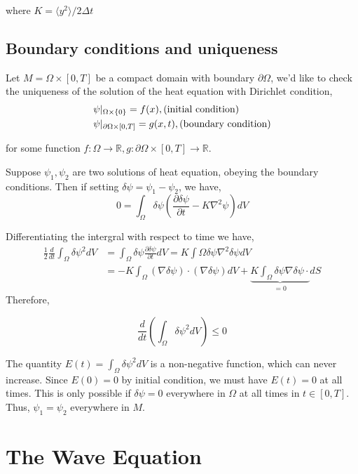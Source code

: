 \documentclass{article}
\theoremstyle{definition}
\begin{document}
where $K=\langle y^2 \rangle /2\Delta t$
\subsection{Boundary conditions and uniqueness}
Let $M=\Omega \times [0,T]$ be a compact domain with boundary $\partial \Omega$, we'd like to check the uniqueness of the solution of the heat equation with Dirichlet condition,
\begin{align}
&\psi |_{\Omega \times \{0\}}=f(x), (\textup{initial condition})\\
&\psi |_{\partial \Omega \times [0,T]}=g(x,t), (\textup{boundary condition})
\end{align}

for some function $f:\Omega \to \mathbb{R}, g: \partial \Omega \times [0,T] \to \mathbb{R}$.

Suppose $\psi_1,\psi_2$ are two solutions of heat equation, obeying the boundary conditions. Then if setting $\delta \psi=\psi_1-\psi_2$, we have,
\begin{equation}
0=\int_{\Omega} \delta \psi \left(\frac{\partial \delta \psi}{\partial t}-K\nabla^2 \psi \right) dV
\end{equation}

Differentiating the intergral with respect to time we have,
\begin{align}
\frac{1}{2}\frac{d}{dt}\int_\Omega \delta \psi^2 dV&=\int_{\Omega} \delta \psi \frac{\partial \delta \psi}{\partial t} dV=K\int{\Omega} \delta \psi \nabla ^2 \delta \psi dV\\
&=-K\int_{\Omega} (\nabla \delta \psi) \cdot (\nabla \delta \psi) dV+\underbrace{K\int_{\Omega} \delta \psi \nabla \delta \psi \cdot}_{=0} dS
\end{align}
Therefore, 

\begin{equation}
\frac{d}{dt} \left(\int_{\Omega} \delta \psi ^2 dV \right) \leq 0
\end{equation}

The quantity $E(t)=\int_{\Omega} \delta \psi ^2 dV$ is a non-negative function, which can never increase. Since $E(0)=0$ by initial condition, we must have $E(t)=0$ at all times. This is only possible if $\delta \psi=0$ everywhere in $\Omega$ at all times in $t \in [0,T]$. Thus, $\psi_1=\psi_2$ everywhere in $M$.


\section{The Wave Equation}
\end{document}
